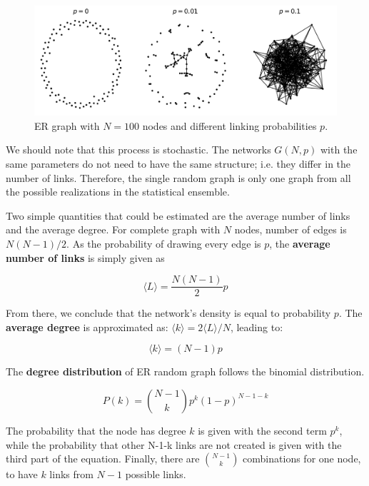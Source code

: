 \begin{figure}[h!]
	\centering
	\includegraphics[width=0.9\linewidth]{figures/methodology/ERgraph}
	\caption{ER graph with $N=100$ nodes and different linking probabilities $p$.}
	\label{fig:erp}
\end{figure}

We should note that this process is stochastic. The networks $G(N, p)$ with the same parameters do not need to have the same structure; i.e. they differ in the number of links. Therefore, the single random graph is only one graph from all the possible realizations in the statistical ensemble. 

Two simple quantities that could be estimated are the average number of links and the average degree. For complete graph with $N$ nodes, number of edges is $N(N-1)/2$. As the probability of drawing every edge is $p$, the \textbf{average number of links} is simply given as 

\begin{equation}
\langle L \rangle = \frac{N(N-1)}{2}p
\end{equation}

From there, we conclude that the network's density is equal to probability $p$.
The \textbf{average degree} is approximated as: $\langle k \rangle = 2 \langle L \rangle / N $, leading to:

\begin{equation}
\langle k \rangle = (N-1)p 
\end{equation}

The \textbf{degree distribution} of ER random graph follows the binomial distribution. 

\begin{equation}
P(k) = \binom{N-1}{k}p^k(1-p)^{N-1-k}
\end{equation}

The probability that the node has degree $k$ is given with the second term $p^k$, while the probability that other N-1-k links are not created is given with the third part of the equation. Finally, there are  $\binom{N-1}{k}$ combinations for one node, to have $k$ links from $N-1$ possible links. 

